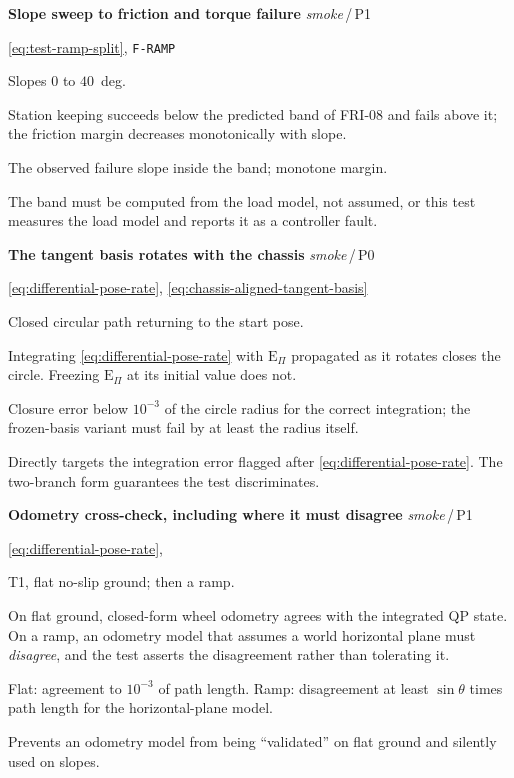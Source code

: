 \documentclass[10pt]{article}
\newenvironment{testcard}[4]{%
  \par\medskip\noindent
  \tBlock{#1}\quad\textbf{#2}%
  \hfill{\small\textit{#3}\,/\,#4}\par\nopagebreak\vspace{2pt}
  \begin{description}[leftmargin=7.5em,style=sameline,itemsep=1pt,topsep=1pt]
}{%
  \end{description}\par\medskip
}
\begin{document}
\begin{testcard}{SMK-09}{Slope sweep to friction and torque failure}{smoke}{P1}
  \item[Targets] \eqref{eq:test-ramp-split}, \texttt{F-RAMP}
  \item[Regime] Slopes $0$ to $40$~deg.
  \item[Invariant] Station keeping succeeds below the predicted band of FRI-08
    and fails above it; the friction margin decreases monotonically with slope.
  \item[Pass] The observed failure slope inside the band; monotone margin.
  \item[Diagnosis] The band must be computed from the load model, not assumed,
    or this test measures the load model and reports it as a controller fault.
\end{testcard}

\begin{testcard}{SMK-10}{The tangent basis rotates with the chassis}{smoke}{P0}
  \item[Targets] \eqref{eq:differential-pose-rate},
    \eqref{eq:chassis-aligned-tangent-basis}
  \item[Regime] Closed circular path returning to the start pose.
  \item[Invariant] Integrating \eqref{eq:differential-pose-rate} with
    $\text{E}_{\Pi}$ propagated as it rotates closes the circle. Freezing
    $\text{E}_{\Pi}$ at its initial value does not.
  \item[Pass] Closure error below $10^{-3}$ of the circle radius for the
    correct integration; the frozen-basis variant must fail by at least the
    radius itself.
  \item[Diagnosis] Directly targets the integration error flagged after
    \eqref{eq:differential-pose-rate}. The two-branch form guarantees the test
    discriminates.
\end{testcard}

\begin{testcard}{SMK-11}{Odometry cross-check, including where it must disagree}{smoke}{P1}
  \item[Targets] \eqref{eq:differential-pose-rate},
  \item[Regime] T1, flat no-slip ground; then a ramp.
  \item[Invariant] On flat ground, closed-form wheel odometry agrees with the
    integrated QP state. On a ramp, an odometry model that assumes a world
    horizontal plane must \emph{disagree}, and the test asserts the
    disagreement rather than tolerating it.
  \item[Pass] Flat: agreement to $10^{-3}$ of path length. Ramp: disagreement
    at least $\sin\theta$ times path length for the horizontal-plane model.
  \item[Diagnosis] Prevents an odometry model from being ``validated'' on flat
    ground and silently used on slopes.
\end{testcard}
\end{document}
